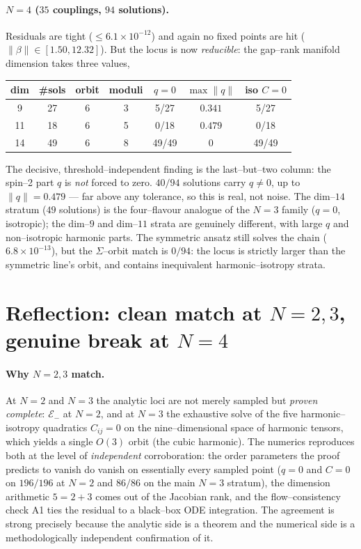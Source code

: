 \documentclass[11pt]{article}
\newcommand{\norm}[1]{\lVert #1\rVert}
\begin{document}
\paragraph{$N=4$ ($35$ couplings, $94$ solutions).}
Residuals are tight ($\le6.1\times10^{-12}$) and again no fixed points are hit
($\norm\beta\in[1.50,12.32]$). But the locus is now \emph{reducible}: the
gap--rank manifold dimension takes three values,
\begin{center}\begin{tabular}{ccccccc}\toprule
dim & \#sols & orbit & moduli & $q{=}0$ & $\max\norm q$ & iso $C{=}0$\\ \midrule
9  & 27 & 6 & 3 & 5/27  & $0.341$ & 5/27 \\
11 & 18 & 6 & 5 & 0/18  & $0.479$ & 0/18 \\
14 & 49 & 6 & 8 & 49/49 & $0$     & 49/49 \\
\bottomrule\end{tabular}\end{center}
The decisive, threshold--independent finding is the last--but--two column: the
spin--2 part $q$ is \emph{not} forced to zero. $40/94$ solutions carry $q\neq0$,
up to $\norm q=0.479$ --- far above any tolerance, so this is real, not noise.
The dim--$14$ stratum ($49$ solutions) is the four--flavour analogue of the
$N=3$ family ($q=0$, isotropic); the dim--$9$ and dim--$11$ strata are
genuinely different, with large $q$ and non--isotropic harmonic parts. The
symmetric ansatz still solves the chain ($6.8\times10^{-13}$), but the
$\Sigma$--orbit match is $0/94$: the locus is strictly larger than the
symmetric line's orbit, and contains inequivalent harmonic--isotropy strata.

\section{Reflection: clean match at $N=2,3$, genuine break at $N=4$}
\label{sec:reflection}

\paragraph{Why $N=2,3$ match.}
At $N=2$ and $N=3$ the analytic loci are not merely sampled but \emph{proven
complete}: $\mathcal E_-$ at $N=2$, and at $N=3$ the exhaustive solve of the
five harmonic--isotropy quadratics $C_{ij}=0$ on the nine--dimensional space of
harmonic tensors, which yields a single $O(3)$ orbit (the cubic harmonic). The
numerics reproduces both at the level of \emph{independent} corroboration: the
order parameters the proof predicts to vanish do vanish on essentially every
sampled point ($q=0$ and $C=0$ on $196/196$ at $N=2$ and $86/86$ on the main
$N=3$ stratum), the dimension arithmetic $5=2+3$ comes out of the Jacobian
rank, and the flow--consistency check A1 ties the residual to a black--box ODE
integration. The agreement is strong precisely because the analytic side is a
theorem and the numerical side is a methodologically independent confirmation
of it.
\end{document}
